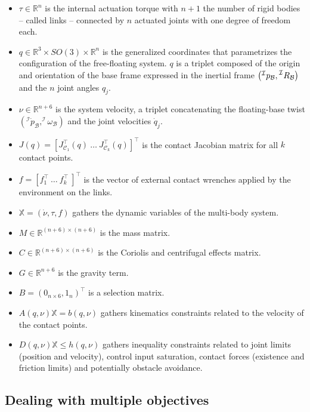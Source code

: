 \documentclass[12pt,a4paper,twoside]{article}
\begin{document}
\begin{itemize}
\item $\tau \in \mathbb{R}^n$ is the internal actuation torque with $n + 1$ the number of rigid bodies -- called links -- connected by $n$ actuated joints with one degree of freedom each.
\item ${q} \in \mathbb{R}^3 \times SO(3)\times \mathbb{R}^n$ is the generalized coordinates that parametrizes the configuration of the free-floating system. $q$ is a triplet composed of the origin and orientation of the base frame expressed in the inertial frame $\left(\prescript{\mathcal{I}}{}p_{\mathcal{B}},\prescript{\mathcal{I}}{}R_{\mathcal{B}}\right)$ and the $n$ joint angles $q_j$.
\item ${\nu} \in \mathbb{R}^{n+6}$ is the system velocity, a triplet concatenating the floating-base twist $\left (^\mathcal{I}\dot{ p}_{\mathcal{B}},^\mathcal{I}\omega_{\mathcal{B}}\right)$ and the joint velocities ${\dot{q}}_j$.
\item ${J}({q})= \left[{J}^\top _{\mathcal{C}_1}({q})~ \dots~ {J}^\top _{\mathcal{C}_k}({q}) \right]^\top$ is the contact Jacobian matrix for all $k$ contact points.
\item $f= \left[ {f}^\top_{1}~ \dots~ {f}^\top_{k}~ \right]^\top $ is the vector of external contact wrenches applied by the environment on the links.
\item $\mathbb{X} = \left(\dot{\nu}, \tau, f \right)$ gathers the dynamic variables of the multi-body system.
\item ${M} \in \mathbb{R}^{(n+6) \times (n+6)}$ is the mass matrix.
\item ${C} \in \mathbb{R}^{(n+6) \times (n+6)}$ is the Coriolis and centrifugal effects matrix.
\item ${G} \in \mathbb{R}^{n+6}$ is the gravity term.
\item $B = (0_{n\times 6} , 1_n)^\top$ is a selection matrix.
\item ${A}(q,\nu) \mathbb{X}   =  {b}(q,\nu)$ gathers kinematics constraints related to the velocity of the contact points.
\item ${D}(q,\nu) \mathbb{X} \leq {h}(q,\nu)$ gathers inequality constraints related to joint limits (position and velocity), control input saturation, contact forces (existence and friction limits) and potentially obstacle avoidance.
\end{itemize}

\subsection{Dealing with multiple objectives}
\end{document}
